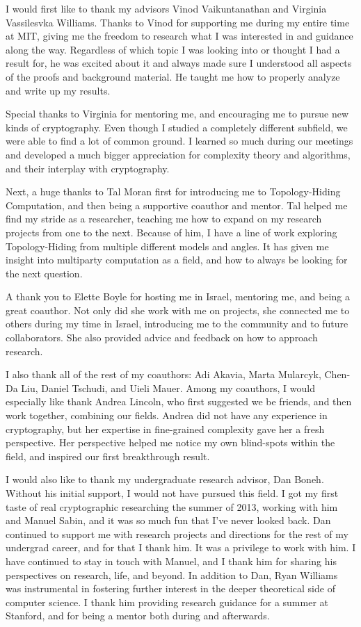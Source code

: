
I would first like to thank my advisors Vinod Vaikuntanathan and Virginia Vassilesvka Williams. Thanks to Vinod for supporting me during my entire time at MIT, giving me the freedom to research what I was interested in and guidance along the way. Regardless of which topic I was looking into or thought I had a result for, he was excited about it and always made sure I understood all aspects of the proofs and background material. He taught me how to properly analyze and write up my results.

Special thanks to Virginia for mentoring me, and encouraging me to pursue new kinds of cryptography. Even though I studied a completely different subfield, we were able to find a lot of common ground. I learned so much during our meetings and developed a much bigger appreciation for complexity theory and algorithms, and their interplay with cryptography.

Next, a huge thanks to Tal Moran first for introducing me to Topology-Hiding Computation, and then being a supportive coauthor and mentor. Tal helped me find my stride as a researcher, teaching me how to expand on my research projects from one to the next. Because of him, I have a line of work exploring Topology-Hiding from multiple different models and angles. It has given me insight into multiparty computation as a field, and how to always be looking for the next question.

A thank you to Elette Boyle for hosting me in Israel, mentoring me, and being a great coauthor. Not only did she work with me on projects, she connected me to others during my time in Israel, introducing me to the community and to future collaborators. She also provided advice and feedback on how to approach research.

I also thank all of the rest of my coauthors: Adi Akavia, Marta Mularcyk, Chen-Da Liu, Daniel Tschudi, and Uieli Mauer. Among my coauthors, I would especially like thank Andrea Lincoln, who first suggested we be friends, and then work together, combining our fields. Andrea did not have any experience in cryptography, but her expertise in fine-grained complexity gave her a fresh perspective. Her perspective helped me notice my own blind-spots within the field, and inspired our first breakthrough result.

I would also like to thank my undergraduate research advisor, Dan Boneh. Without his initial support, I would not have pursued this field. I got my first taste of real cryptographic researching the summer of 2013, working with him and Manuel Sabin, and it was so much fun that I've never looked back. Dan continued to support me with research projects and directions for the rest of my undergrad career, and for that I thank him. It was a privilege to work with him.
I have continued to stay in touch with Manuel, and I thank him for sharing his perspectives on research, life, and beyond.
In addition to Dan, Ryan Williams was instrumental in fostering further interest in the deeper theoretical side of computer science. I thank him providing research guidance for a summer at Stanford, and for being a mentor both during and afterwards.

